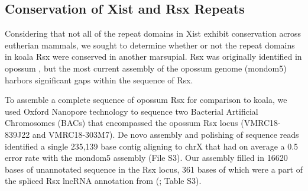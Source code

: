 \subsection{Conservation of Xist and Rsx Repeats}
Considering that not all of the repeat domains in Xist exhibit conservation across eutherian mammals, we sought to determine whether or not the repeat domains in koala Rsx were conserved in another marsupial. Rsx was originally identified in opossum \cite{Grant2012RsxInactivation}, but the most current assembly of the opossum genome (mondom5) harbors significant gaps within the sequence of Rsx. 

To assemble a complete sequence of opossum Rsx for comparison to koala, we used Oxford Nanopore technology to sequence two Bacterial Artificial Chromosomes (BACs) that encompassed the opossum Rsx locus (VMRC18-839J22 and VMRC18-303M7). De novo assembly and polishing of sequence reads identified a single 235,139 base contig aligning to chrX that had on average a 0.5 error rate with the mondom5 assembly (File S3). Our assembly filled in 16620 bases of unannotated sequence in the Rsx locus, 361 bases of which were a part of the spliced Rsx lncRNA annotation from (\cite{Grant2012RsxInactivation}; Table S3).

